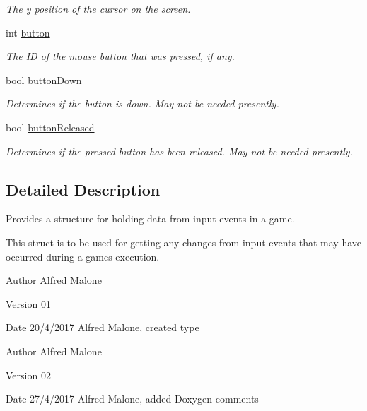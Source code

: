 \begin{DoxyCompactItemize}
\begin{DoxyCompactList}\small\item\em The y position of the cursor on the screen. \end{DoxyCompactList}\item 
int \hyperlink{structevents_1_1game_event_a95165a2ecae8e54ecf685c65ec9882f2}{button}
\begin{DoxyCompactList}\small\item\em The I\+D of the mouse button that was pressed, if any. \end{DoxyCompactList}\item 
bool \hyperlink{structevents_1_1game_event_ab89824ec88726cc79e11869d38d56aed}{button\+Down}
\begin{DoxyCompactList}\small\item\em Determines if the button is down. May not be needed presently. \end{DoxyCompactList}\item 
bool \hyperlink{structevents_1_1game_event_ab0db744a869247106087de674e7dbfca}{button\+Released}
\begin{DoxyCompactList}\small\item\em Determines if the pressed button has been released. May not be needed presently. \end{DoxyCompactList}\end{DoxyCompactItemize}


\subsection{Detailed Description}
Provides a structure for holding data from input events in a game. 

This struct is to be used for getting any changes from input events that may have occurred during a game\textquotesingle{}s execution.

\begin{DoxyAuthor}{Author}
Alfred Malone 
\end{DoxyAuthor}
\begin{DoxyVersion}{Version}
01 
\end{DoxyVersion}
\begin{DoxyDate}{Date}
20/4/2017 Alfred Malone, created type
\end{DoxyDate}
\begin{DoxyAuthor}{Author}
Alfred Malone 
\end{DoxyAuthor}
\begin{DoxyVersion}{Version}
02 
\end{DoxyVersion}
\begin{DoxyDate}{Date}
27/4/2017 Alfred Malone, added Doxygen comments 
\end{DoxyDate}


